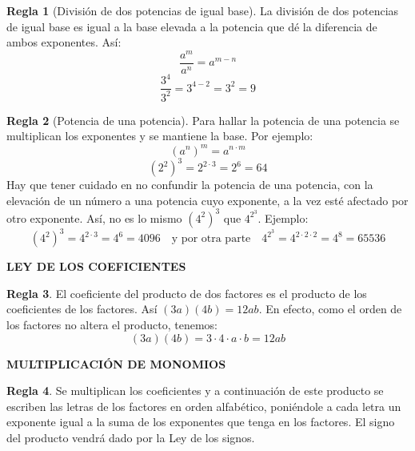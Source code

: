 \documentclass[12pt,letterpaper]{article}
\theoremstyle{definition}
\newtheorem{reg}{Regla}
\begin{document}
\begin{reg}[División de dos potencias de igual base] %
La división de dos potencias de igual base es igual a la base elevada a la potencia que dé la diferencia de ambos exponentes. Así:
\begin{equation*}
\dfrac{a^m}{a^n} = a^{m-n}
\end{equation*}
\begin{equation*}
\dfrac{3^4}{3^2} = 3^{4-2} = 3^2 = 9
\end{equation*}
\end{reg}

\begin{reg}[Potencia de una potencia]%
Para hallar la potencia de una potencia se multiplican los exponentes y se mantiene la base. Por ejemplo:
\begin{equation*}
\left(a^n\right)^m = a^{n\cdot m}
\end{equation*}
\begin{equation*}
\left(2^2\right)^3 = 2^{2\cdot 3}=2^6=64
\end{equation*}
Hay que tener cuidado en no confundir la potencia de una potencia, con la elevación de un número a una potencia cuyo exponente, a la vez esté afectado por otro exponente. Así, no es lo mismo $\left(4^2\right)^3$ que $4^{2^3}$. Ejemplo:
\begin{equation*}
\left(4^2\right)^3 = 4^{2\cdot 3}=4^6=4096 \quad \text{y por otra parte} \quad  4^{2^3}=4^{2\cdot 2\cdot 2}=4^8=65536
\end{equation*}
\end{reg}

\vspace{1mm}

\textbf{LEY DE LOS COEFICIENTES}

\begin{reg} %
El coeficiente del producto de dos factores es el producto de los coeficientes de los factores. Así $(3a)(4b)=12ab$. En efecto, como el orden de los factores no altera el producto, tenemos:
\begin{equation*}
(3a)(4b)=3\cdot4\cdot a \cdot b=12ab
\end{equation*}
\end{reg}

\vspace{1mm}

\textbf{MULTIPLICACIÓN DE MONOMIOS}

\begin{reg} %
Se multiplican los coeficientes y a continuación de este producto se escriben las letras de los factores en orden alfabético, poniéndole a cada letra un exponente igual a la suma de los exponentes que tenga en los factores. El signo del producto vendrá dado por la Ley de los signos.
\end{reg}
\end{document}
